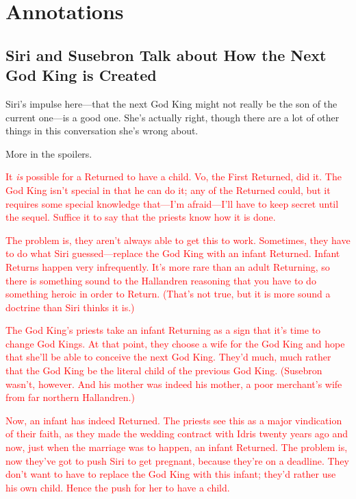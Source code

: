 \section*{Annotations}

\subsection*{Siri and Susebron Talk about How the Next God King is Created}

Siri’s impulse here—that the next God King might not really be the son of the current one—is a good one. She’s actually right, though there are a lot of other things in this conversation she’s wrong about.

More in the spoilers.

\textcolor{red}{
It \textit{is} possible for a Returned to have a child. Vo, the First Returned, did it. The God King isn’t special in that he can do it; any of the Returned could, but it requires some special knowledge that—I’m afraid—I’ll have to keep secret until the sequel. Suffice it to say that the priests know how it is done.
}

\textcolor{red}{
The problem is, they aren’t always able to get this to work. Sometimes, they have to do what Siri guessed—replace the God King with an infant Returned. Infant Returns happen very infrequently. It’s more rare than an adult Returning, so there is something sound to the Hallandren reasoning that you have to do something heroic in order to Return. (That’s not true, but it is more sound a doctrine than Siri thinks it is.)
}

\textcolor{red}{
The God King’s priests take an infant Returning as a sign that it’s time to change God Kings. At that point, they choose a wife for the God King and hope that she’ll be able to conceive the next God King. They’d much, much rather that the God King be the literal child of the previous God King. (Susebron wasn’t, however. And his mother was indeed his mother, a poor merchant’s wife from far northern Hallandren.)
}

\textcolor{red}{
Now, an infant has indeed Returned. The priests see this as a major vindication of their faith, as they made the wedding contract with Idris twenty years ago and now, just when the marriage was to happen, an infant Returned. The problem is, now they’ve got to push Siri to get pregnant, because they’re on a deadline. They don’t want to have to replace the God King with this infant; they’d rather use his own child. Hence the push for her to have a child.
}

